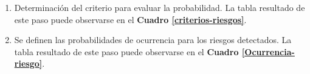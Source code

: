 \begin{enumerate}
	\item Determinación del criterio para evaluar la probabilidad.
    La tabla resultado de este paso puede observarse en el \textbf{Cuadro \ref{criterios-riesgos}}.
    
	\begin{table}[h]
        \centering
        \caption{Criterios para el análisis cuantitativo de riesgos.}
        \label{criterios-riesgos}
    \end{table}
    
    \item Se definen las probabilidades de ocurrencia para los riesgos detectados.
    La tabla resultado de este paso puede observarse en el \textbf{Cuadro \ref{Ocurrencia-riesgo}}.
    

\end{enumerate}
